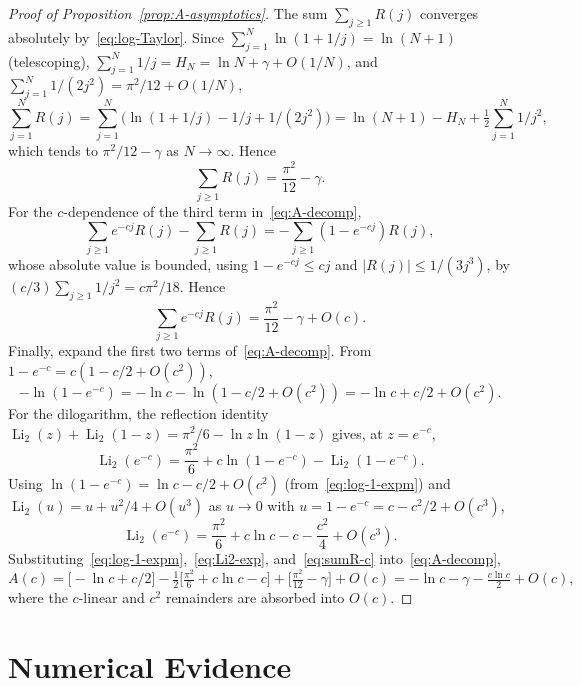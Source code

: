 \documentclass[11pt]{article}
\theoremstyle{remark}
\DeclareMathOperator{\Li}{Li}
\begin{document}
\begin{proof}[Proof of Proposition~\ref{prop:A-asymptotics}]
The sum $\sum_{j \geq 1} R(j)$ converges absolutely by~\eqref{eq:log-Taylor}. Since $\sum_{j=1}^N \ln(1 + 1/j) = \ln(N+1)$ (telescoping), $\sum_{j=1}^N 1/j = H_N = \ln N + \gamma + O(1/N)$, and $\sum_{j=1}^N 1/(2j^2) = \pi^2/12 + O(1/N)$,
\[
\sum_{j=1}^N R(j) = \sum_{j=1}^N \bigl(\ln(1+1/j) - 1/j + 1/(2j^2)\bigr) = \ln(N+1) - H_N + \tfrac12 \sum_{j=1}^N 1/j^2,
\]
which tends to $\pi^2/12 - \gamma$ as $N \to \infty$. Hence
\begin{equation}\label{eq:sum-R}
\sum_{j \geq 1} R(j) = \frac{\pi^2}{12} - \gamma.
\end{equation}
For the $c$-dependence of the third term in~\eqref{eq:A-decomp},
\[
\sum_{j \geq 1} e^{-cj} R(j) - \sum_{j \geq 1} R(j) = -\sum_{j \geq 1}(1 - e^{-cj}) R(j),
\]
whose absolute value is bounded, using $1 - e^{-cj} \leq cj$ and $|R(j)| \leq 1/(3j^3)$, by $(c/3) \sum_{j \geq 1} 1/j^2 = c\pi^2/18$. Hence
\begin{equation}\label{eq:sumR-c}
\sum_{j \geq 1} e^{-cj} R(j) = \frac{\pi^2}{12} - \gamma + O(c).
\end{equation}
Finally, expand the first two terms of~\eqref{eq:A-decomp}. From $1 - e^{-c} = c(1 - c/2 + O(c^2))$,
\begin{equation}\label{eq:log-1-expm}
-\ln(1 - e^{-c}) = -\ln c - \ln(1 - c/2 + O(c^2)) = -\ln c + c/2 + O(c^2).
\end{equation}
For the dilogarithm, the reflection identity $\Li_2(z) + \Li_2(1 - z) = \pi^2/6 - \ln z \ln(1 - z)$ gives, at $z = e^{-c}$,
\[
\Li_2(e^{-c}) = \frac{\pi^2}{6} + c \ln(1 - e^{-c}) - \Li_2(1 - e^{-c}).
\]
Using $\ln(1 - e^{-c}) = \ln c - c/2 + O(c^2)$ (from~\eqref{eq:log-1-expm}) and $\Li_2(u) = u + u^2/4 + O(u^3)$ as $u \to 0$ with $u = 1 - e^{-c} = c - c^2/2 + O(c^3)$,
\begin{equation}\label{eq:Li2-exp}
\Li_2(e^{-c}) = \frac{\pi^2}{6} + c \ln c - c - \frac{c^2}{4} + O(c^3).
\end{equation}
Substituting~\eqref{eq:log-1-expm},~\eqref{eq:Li2-exp}, and~\eqref{eq:sumR-c} into~\eqref{eq:A-decomp},
\[
A(c) = \bigl[-\ln c + c/2\bigr] - \tfrac12\bigl[\tfrac{\pi^2}{6} + c\ln c - c\bigr] + \bigl[\tfrac{\pi^2}{12} - \gamma\bigr] + O(c) = -\ln c - \gamma - \tfrac{c \ln c}{2} + O(c),
\]
where the $c$-linear and $c^2$ remainders are absorbed into $O(c)$.
\end{proof}

\section{Numerical Evidence}\label{sec:numerics}
\end{document}
